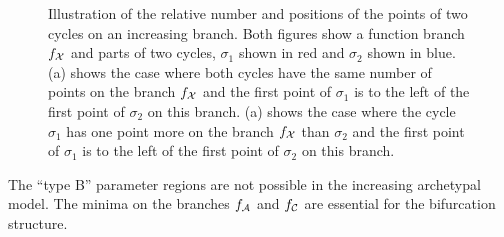 \begin{figure}
	\centering
	 \quad
	\caption[Illustration of the relative number and positions of the points of two cycles on an increasing branch]{
		Illustration of the relative number and positions of the points of two cycles on an increasing branch.
		Both figures show a function branch $f_{\mathcal{X}}$ and parts of two cycles, $\sigma_1$ shown in red and $\sigma_2$ shown in blue.
		(a) shows the case where both cycles have the same number of points on the branch $f_{\mathcal{X}}$ and the first point of $\sigma_1$ is to the left of the first point of $\sigma_2$ on this branch.
		(a) shows the case where the cycle $\sigma_1$ has one point more on the branch $f_{\mathcal{X}}$ than $\sigma_2$ and the first point of $\sigma_1$ is to the left of the first point of $\sigma_2$ on this branch.
	}
	\label{fig:add.change.increasing}
\end{figure}

\begin{theorem}
	The ``type B'' parameter regions are not possible in the increasing archetypal model.
	The minima on the branches $f_{\mathcal{A}}$ and $f_{\mathcal{C}}$ are essential for the bifurcation structure.
\end{theorem}

